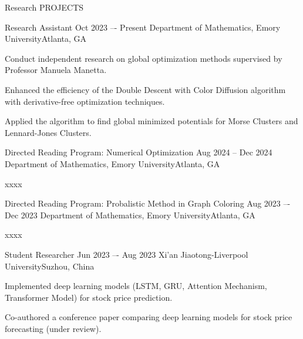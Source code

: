 \documentclass[10pt, letterpaper]{resume} %
\begin{document}

\begin{rSection}{Research PROJECTS}

\begin{rSubsection}
	{Research Assistant}
	{Oct 2023 –- Present}
	{Department of Mathematics, Emory University\hfill{Atlanta, GA}}
	
	\item Conduct independent research on global optimization methods supervised by Professor Manuela Manetta.
	\item Enhanced the efficiency of the Double Descent with Color Diffusion algorithm with derivative-free optimization techniques.
	\item Applied the algorithm to find global minimized potentials for Morse Clusters and Lennard-Jones Clusters.
\end{rSubsection}

\begin{rSubsection}
	{Directed Reading Program: Numerical Optimization}
	{Aug 2024 -- Dec 2024}
	{Department of Mathematics, Emory University\hfill{Atlanta, GA}}
	
	\item xxxx
\end{rSubsection}

\begin{rSubsection}
	{Directed Reading Program: Probalistic Method in Graph Coloring}
	{Aug 2023 –- Dec 2023}
	{Department of Mathematics, Emory University\hfill{Atlanta, GA}}
	
	\item xxxx
\end{rSubsection}

\begin{rSubsection}
	{Student Researcher}
	{Jun 2023 –- Aug 2023}
	{Xi’an Jiaotong-Liverpool University\hfill{Suzhou, China}}
	
	\item Implemented deep learning models (LSTM, GRU, Attention Mechanism, Transformer Model) for stock price prediction.
	\item Co-authored a conference paper comparing deep learning models for stock price forecasting (under review).
\end{rSubsection}

\end{rSection} 

% 
\end{document}
